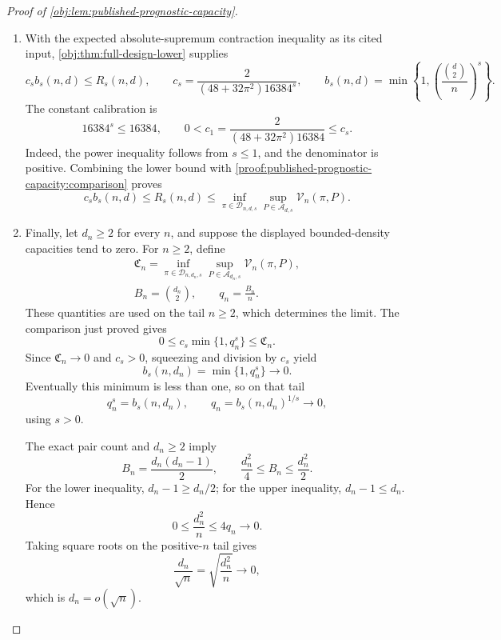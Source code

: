 \begin{proof}[Proof of \cref{obj:lem:published-prognostic-capacity}]
\begin{enumerate}
\item With the expected absolute-supremum contraction inequality
\citep[Theorem 12(4), with Definition 2]{BartlettMendelson2002Complexities}
as its cited input, \cref{obj:thm:full-design-lower} supplies
\[
c_s b_s(n,d)\leq R_s(n,d),
\qquad
c_s=\frac{2}{(48+32\pi^2)16384^s},
\qquad
b_s(n,d)=\min\left\{1,\left(\frac{\binom d2}{n}\right)^s\right\}.
\]
The constant calibration is
\[
16384^s\leq16384,
\qquad
0<c_1=\frac{2}{(48+32\pi^2)16384}\leq c_s.
\]
Indeed, the power inequality follows from \(s\leq1\), and the denominator is positive. Combining the lower bound with \cref{proof:published-prognostic-capacity:comparison} proves
\[
c_s b_s(n,d)
\leq R_s(n,d)
\leq
\inf_{\pi\in\mathcal D_{n,d,s}}
\sup_{P\in\mathcal A_{d,s}}\mathcal V_n(\pi,P).
\]

\item Finally, let \(d_n\geq2\) for every \(n\), and suppose the displayed bounded-density capacities tend to zero. For \(n\geq2\), define
\[
\begin{gathered}
\mathfrak C_n
=
\inf_{\pi\in\mathcal D_{n,d_n,s}}
\sup_{P\in\mathcal A_{d_n,s}}\mathcal V_n(\pi,P),\\
B_n=\binom{d_n}{2},
\qquad
q_n=\frac{B_n}{n}.
\end{gathered}
\]
These quantities are used on the tail \(n\geq2\), which determines the limit. The comparison just proved gives
\[
0\leq c_s\min\{1,q_n^s\}\leq\mathfrak C_n.
\]
Since \(\mathfrak C_n\to0\) and \(c_s>0\), squeezing and division by \(c_s\) yield
\[
b_s(n,d_n)=\min\{1,q_n^s\}\longrightarrow0.
\]
Eventually this minimum is less than one, so on that tail
\[
q_n^s=b_s(n,d_n),
\qquad
q_n=b_s(n,d_n)^{1/s}\longrightarrow0,
\]
using \(s>0\).

The exact pair count and \(d_n\geq2\) imply
\[
B_n=\frac{d_n(d_n-1)}2,
\qquad
\frac{d_n^2}{4}\leq B_n\leq\frac{d_n^2}{2}.
\]
For the lower inequality, \(d_n-1\geq d_n/2\); for the upper inequality, \(d_n-1\leq d_n\). Hence
\[
0\leq\frac{d_n^2}{n}\leq4q_n\longrightarrow0.
\]
Taking square roots on the positive-\(n\) tail gives
\[
\frac{d_n}{\sqrt n}
=\sqrt{\frac{d_n^2}{n}}\longrightarrow0,
\]
which is \(d_n=o(\sqrt n)\).
\end{enumerate}
\end{proof}
